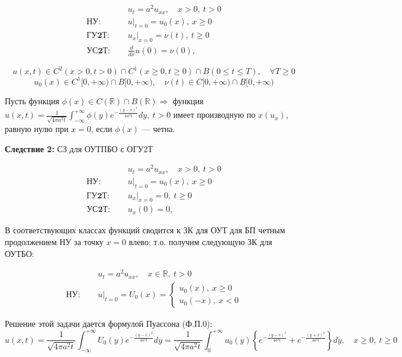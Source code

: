 \begin{align*}
	& u_{t} = a^2 u_{xx}, \quad x > 0,\ t > 0 \tag{1.0}    \\
	\textbf{НУ: } \quad    & u|_{t=0}=u_0(x),\ x \ge 0 \tag{2} \\
	\textbf{ГУ2Т: } \quad & u_x|_{x=0} = \nu(t),\ t \ge 0 \tag{3.2}                      \\
	\textbf{УС2Т: } \quad    & \frac{d}{dx}u(0)=\nu(0), \tag{4.2}
\end{align*}

\[
u(x, t) \in C^2(x > 0, t > 0) \cap C^1(x \ge 0, t \ge 0) \cap B(0 \le t \le T),\quad \forall T \ge 0
\]
\[
u_0(x) \in C^1[0, +\infty) \cap B[0, +\infty),\quad
\nu(t) \in C[0, +\infty) \cap B[0, +\infty)
\]

\begin{lemma}
	Пусть функция $\phi (x) \in C(\mathbb{R}) \cap B(\mathbb{R}) \Rightarrow$ функция $u(x, t) = \frac{1}{\sqrt{4\pi a^2 t}}\int_{-\infty}^{+\infty} \phi(y) e^{-\frac{(y-x)^2}{4a^2 t}} dy,\ t>0$ имеет производную по $x (u_x)$, равную нулю при $x=0$, если $\phi(x)$ --- четна. 
\end{lemma}

\textbf{Следствие 2:} СЗ для ОУТПБО с ОГУ2Т

\begin{align*}
	& u_{t} = a^2 u_{xx}, \quad x > 0,\ t > 0 \tag{1.0}    \\
	\textbf{НУ: } \quad    & u|_{t=0}=u_0(x),\ x \ge 0 \tag{2} \\
	\textbf{ГУ2Т: } \quad & u_x|_{x=0} = 0,\ t \ge 0 \tag{3.2.0}                      \\
	\textbf{УС2Т: } \quad    & u_x(0)=0, \tag{4.2.0}
\end{align*}

В соответствующих классах функций сводится к ЗК для ОУТ для БП четным продолжением НУ за точку $x=0$ влево; т.о. получим следующую ЗК для ОУТБО:

\begin{align*}
	& u_{t} = a^2 u_{xx}, \quad x \in \mathbb{R},\ t > 0 \tag{1.0}    \\
	\textbf{НУ: } \quad    & u|_{t=0}=U_0(x)=
	\begin{cases}
		u_0(x),\ x \ge 0\\
		u_0(-x),\ x < 0
	\end{cases} \tag{2}
\end{align*}

Решение этой задачи дается формулой Пуассона (Ф.П.0):
\[
	u(x, t) = \frac{1}{\sqrt{4\pi a^2t}} \int_{-\infty}^{+\infty} U_0(y) e^{-\frac{(y-x)^2}{4a^{2}t}} dy = 
	\frac{1}{\sqrt{4\pi a^2t}} \int_{0}^{+\infty} u_0(y) \left\{ e^{-\frac{(y-x)^2}{4a^{2}t}} + e^{-\frac{(y+x)^2}{4a^{2}t}} \right\} dy,\quad
	x \ge 0,\ t \ge 0
\]

